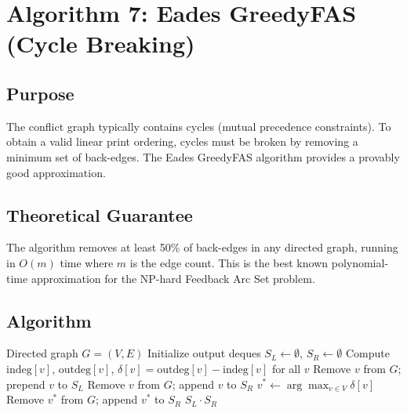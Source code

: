 \documentclass[11pt,a4paper]{article}
\newcommand{\Oh}[1]{$O(#1)$}
\begin{document}
\section{Algorithm 7: Eades GreedyFAS (Cycle Breaking)}
\label{sec:eades}

\subsection{Purpose}

The conflict graph typically contains cycles (mutual precedence constraints). To obtain a valid linear print ordering, cycles must be broken by removing a minimum set of back-edges. The Eades GreedyFAS algorithm provides a provably good approximation.

\subsection{Theoretical Guarantee}

The algorithm removes at least 50\% of back-edges in any directed graph, running in \Oh{m} time where $m$ is the edge count. This is the best known polynomial-time approximation for the NP-hard Feedback Arc Set problem.

\subsection{Algorithm}

\begin{algorithm}[H]
\caption{Eades GreedyFAS Linear Ordering}
\begin{algorithmic}[1]
\Require Directed graph $G = (V, E)$
\State Initialize output deques $S_L \gets \emptyset$, $S_R \gets \emptyset$
\State Compute $\text{indeg}[v]$, $\text{outdeg}[v]$, $\delta[v] = \text{outdeg}[v] - \text{indeg}[v]$ for all $v$
    \Repeat
            \State Remove $v$ from $G$; prepend $v$ to $S_L$
        \EndWhile
            \State Remove $v$ from $G$; append $v$ to $S_R$
        \EndWhile
        \State $v^* \gets \arg\max_{v \in V} \delta[v]$ 
        \State Remove $v^*$ from $G$; append $v^*$ to $S_R$
    \EndIf
\EndWhile
\State \Return $S_L \cdot S_R$ 
\end{algorithmic}
\end{algorithm}
\end{document}

